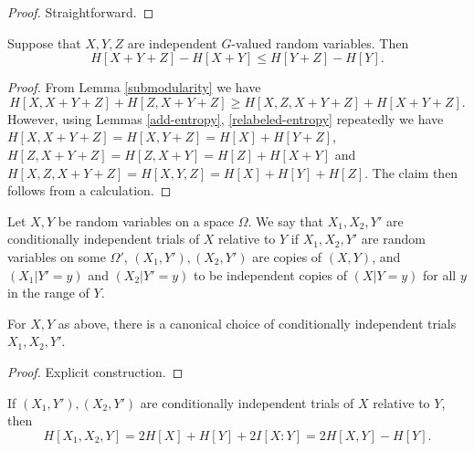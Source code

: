 \begin{proof} Straightforward.
\end{proof}

\begin{lemma}\label{kv}
Suppose that $X, Y, Z$ are independent $G$-valued random variables. Then
\[
  H[X + Y + Z] - H[X + Y] \leq H[Y+Z] - H[Y].
\]
\end{lemma}

\begin{proof}
From Lemma \ref{submodularity} we have
$$ H[X, X+Y+Z] + H[Z, X+Y+Z] \geq H[X, Z, X+Y+Z] + H[X+Y+Z].$$
However, using Lemmas \ref{add-entropy}, \ref{relabeled-entropy} repeatedly we have $H[X, X+Y+Z] = H[X, Y+Z] = H[X] + H[Y+Z]$, $H[Z, X+Y + Z] = H[Z, X+Y] = H[Z] + H[X+Y]$ and $H[X, Z, X+Y+Z] = H[X, Y, Z] = H[X] + H[Y] + H[Z]$.  The claim then follows from a calculation.
\end{proof}

\begin{definition}\label{cond-trial}  Let $X,Y$ be random variables on a space $\Omega$.
  We say that $X_1, X_2, Y'$ are conditionally independent trials of $X$ relative to $Y$ if $X_1,X_2,Y'$ are random variables on some $\Omega'$, $(X_1,Y'), (X_2,Y')$ are copies of $(X,Y)$, and $(X_1 | Y' = y)$ and $(X_2 | Y' = y)$ to be independent copies of $(X | Y = y)$ for all $y$ in the range of $Y$.
\end{definition}

\begin{lemma}\label{cond-indep-exist}
  For $X,Y$ as above, there is a canonical choice of conditionally independent trials $X_1,X_2,Y'$.
\end{lemma}

\begin{proof} Explicit construction.
\end{proof}

\begin{lemma}\label{cond-trial-ent}
  If $(X_1,Y'), (X_2,Y')$ are conditionally
independent trials of $X$ relative to $Y$, then
$$ H[X_1,X_2,Y] = 2 H[X] + H[Y] + 2 I[X:Y] = 2 H[X,Y] - H[Y].$$
\end{lemma}

